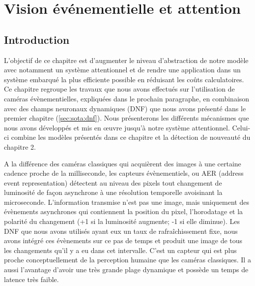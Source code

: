 
\chapter{Vision événementielle et attention}
	\minitoc
	\newpage





	\section{Introduction}

	L'objectif de ce chapitre est d'augmenter le niveau d'abstraction de notre modèle avec notamment un système attentionnel et de rendre une application dans un système embarqué la plus efficiente possible en réduisant les coûts calculatoires. Ce chapitre regroupe les travaux que nous avons effectués sur l'utilisation de caméras évènementielles, expliquées dans le prochain paragraphe, en combinaison avec des champs neuronaux dynamiques (DNF) que nous avons présenté dans le premier chapitre (\ref{sec:sota:dnf}). Nous présenterons les différents mécanismes que nous avons développés et mis en œuvre jusqu'à notre système attentionnel. Celui-ci combine les modèles présentés dans ce chapitre et la détection de nouveauté du chapitre 2. 

	A la différence des caméras classiques qui acquièrent des images à une certaine cadence proche de la milliseconde, les capteurs évènementiels, ou AER (address event representation) détectent au niveau des pixels tout changement de luminosité de façon asynchrone à une résolution temporelle avoisinant la microseconde. L'information transmise n'est pas une image, mais uniquement des évènements asynchrones qui contiennent la position du pixel, l'horodatage et la polarité du changement (+1 si la luminosité augmente; -1 si elle diminue). Les DNF que nous avons utilisés ayant eux un taux de rafraîchissement fixe, nous avons intégré ces évènements sur ce pas de temps et produit une image de tous les changements qu'il y a eu dans cet intervalle. C'est un capteur qui est plus proche conceptuellement de la perception humaine que les caméras classiques. Il a aussi l'avantage d'avoir une très grande plage dynamique et possède un temps de latence très faible. \cite{gallego2019event}

